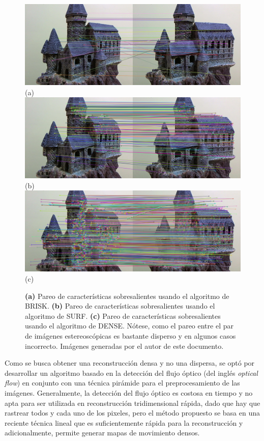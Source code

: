 \begin{figure}[H]
\centering
\includegraphics[width=1.0\textwidth]{images/briskmatches1.png}
(a)
\includegraphics[width=1.0\textwidth]{images/surfmatches1.png}
(b)
\includegraphics[width=1.0\textwidth]{images/densematches1.png}
(c)
\caption[Pareo de caracter\'{i}sticas y descriptores invariantes usando BRISK, SURF y DENSE]%
{\textbf{(a)} Pareo de caracter\'{i}sticas sobresalientes usando el algoritmo de BRISK. \textbf{(b)} Pareo de caracter\'{i}sticas sobresalientes usando el algoritmo de SURF. \textbf{(c)} Pareo de caracter\'{i}sticas sobresalientes usando el algoritmo de DENSE. N\'{o}tese, como el pareo entre el par de im\'{a}genes estereosc\'{o}picas es bastante disperso y en algunos casos incorrecto. Im\'{a}genes generadas por el autor de este documento.}
\label{fig:FeatureMatching1}
\end{figure}


Como se busca obtener una reconstrucci\'{o}n densa y no una dispersa, se opt\'{o} por desarrollar un algoritmo basado en la detecci\'{o}n del flujo \'{o}ptico (del ingl\'{e}s \textit{optical flow}) \cite{Szeliski_2010,Cyganek_Siebert_2009} en conjunto con una t\'{e}cnica pir\'{a}mide para el preprocesamiento de las im\'{a}genes. Generalmente, la detecci\'{o}n del flujo \'{o}ptico es costosa en tiempo y no apta para ser utilizada en reconstrucci\'{o}n tridimensional r\'{a}pida, dado que hay que rastrear todos y cada uno de los pixeles, pero el m\'{e}todo propuesto se basa en una reciente t\'{e}cnica lineal que es suficientemente r\'{a}pida para la reconstrucci\'{o}n y adicionalmente, permite generar mapas de movimiento densos.

